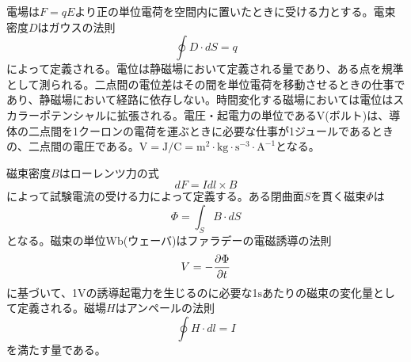     電場は$F = qE$より正の単位電荷を空間内に置いたときに受ける力とする。電束密度$D$はガウスの法則
        \[\oint D \cdot dS = q\]
    によって定義される。電位は静磁場において定義される量であり、ある点を規準として測られる。二点間の電位差はその間を単位電荷を移動させるときの仕事であり、静磁場において経路に依存しない。時間変化する磁場においては電位はスカラーポテンシャルに拡張される。電圧・起電力の単位である$\mathrm{V}$(ボルト)は、導体の二点間を1クーロンの電荷を運ぶときに必要な仕事が1ジュールであるときの、二点間の電圧である。$\mathrm{V} = \mathrm{J} / \mathrm{C} = \mathrm{m}^2 \cdot \mathrm{kg} \cdot \mathrm{s}^{-3} \cdot \mathrm{A}^{-1}$となる。

    磁束密度$B$はローレンツ力の式
        \[dF = Idl \times B\]
    によって試験電流の受ける力によって定義する。ある閉曲面$S$を貫く磁束$\Phi$は
        \[\Phi = \int_S B \cdot dS\]
    となる。磁束の単位$\mathrm{Wb}$(ウェーバ)はファラデーの電磁誘導の法則
        \[V = -\pdv{\Phi}{t}\]
    に基づいて、1$\mathrm{V}$の誘導起電力を生じるのに必要な1$\mathrm{s}$あたりの磁束の変化量として定義される。磁場$H$はアンペールの法則
        \[\oint H \cdot dl = I\]
    を満たす量である。